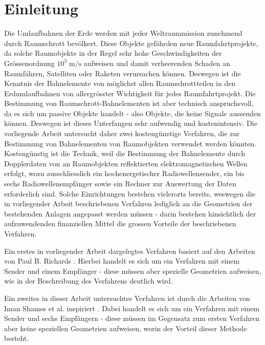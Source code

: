 \documentclass[a4paper,12pt]{article}
\numberwithin{equation}{section}
\begin{document}
\newpage
{}
\tableofcontents


\FloatBarrier
\newpage

\setcounter{page}{1}

\section{Einleitung}
Die Umlaufbahnen der Erde werden mit jeder Weltraummission zunehmend durch Raumschrott bevölkert. Diese Objekte gefährden neue Raumfahrtprojekte, da solche Raumobjekte in der Regel sehr hohe Geschwindigkeiten der Grössenordnung $10^3 \; \si{\meter\per\second}$ aufweisen und damit verheerenden Schaden an Raumfähren, Satelliten oder Raketen verursachen können. Deswegen ist die Kenntnis der Bahnelemente von möglichst allen Raumschrottteilen in den Erdumlaufbahnen von allergrösster Wichtigkeit für jedes Raumfahrtprojekt. Die Bestimmung von Raumschrott-Bahnelementen ist aber technisch anspruchsvoll, da es sich um passive Objekte handelt - also Objekte, die keine Signale aussenden können. Deswegen ist dieses Unterfangen sehr aufwendig und kostenintensiv. Die vorliegende Arbeit untersucht daher zwei kostengünstige Verfahren, die zur Bestimmung von Bahnelementen von Raumobjekten verwendet werden könnten. Kostengünstig ist die Technik, weil die Bestimmung der Bahnelemente durch Dopplerdaten von an Raumobjekten reflektierten elektromagnetischen Wellen erfolgt, wozu ausschliesslich ein hochenergetischer Radiowellensender, ein bis sechs Radiowellenempfänger sowie ein Rechner zur Auswertung der Daten erforderlich sind. Solche Einrichtungen bestehen vielerorts bereits, weswegen die in vorliegender Arbeit beschriebenen Verfahren lediglich an die Geometrien der bestehenden Anlagen angepasst werden müssen - darin bestehen hinsichtlich der aufzuwendenden finanziellen Mittel die grossen Vorteile der beschriebenen Verfahren.

Ein erstes in vorliegender Arbeit dargelegtes Verfahren basiert auf den Arbeiten von Paul B. Richards \cite{Richards.1961}. Hierbei handelt es sich um ein Verfahren mit einem Sender und einem Empfänger - diese müssen aber spezielle Geometrien aufweisen, wie in der Beschreibung des Verfahrens deutlich wird.

Ein zweites in dieser Arbeit untersuchtes Verfahren ist durch die Arbeiten von Iman Shames et al. inspiriert \cite{Shames.2013}. Dabei handelt es sich um ein Verfahren mit einem Sender und sechs Empfängern - diese müssen im Gegensatz zum ersten Verfahren aber keine speziellen Geometrien aufweisen, worin der Vorteil dieser Methode besteht.
\end{document}
